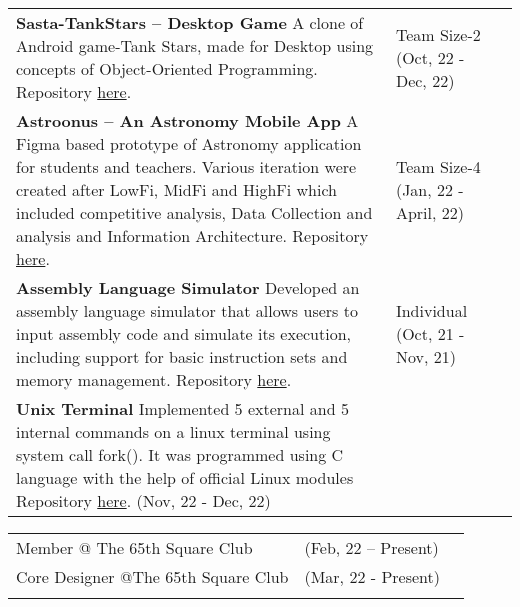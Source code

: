 \documentclass[10pt]{extarticle}
\begin{document}
\begin{contained}
\begin{longtable}{p{}p{}p{}}
    \textbf{Sasta-TankStars – Desktop Game}\newline
    A clone of Android game-Tank Stars, made for Desktop
   using concepts of Object-Oriented Programming.
    Repository \href{https://github.com/ankitkat042/Sasta-TankStars}{here}.
    &Team Size-2
    \newline (Oct, 22 - Dec, 22)\\
    \textbf{Astroonus – An Astronomy Mobile App}\newline
	 A Figma based prototype of Astronomy application for students and teachers. Various iteration were created after LowFi, MidFi and HighFi which included competitive analysis, Data Collection and analysis and Information Architecture. Repository \href{https://www.figma.com/proto/szWw1TAiKRyx429Z5nkSvS/Astroonus\_version\_1.0.1}{here}.
    &Team Size-4
    \newline (Jan, 22 - April, 22)\\
    \textbf{Assembly Language Simulator}\newline
    Developed an assembly language simulator that allows users to input assembly code and simulate its execution, including support for basic instruction sets and memory management. Repository \href{https://github.com/ankitkat042/assembler-simulator}{here}.
    &Individual
    \newline (Oct, 21 - Nov, 21)\\
    \textbf{Unix Terminal}\newline
    Implemented 5 external and 5 internal commands on a linux terminal using system call fork(). It was programmed using C language with the help of official Linux modules
    Repository \href{https://github.com/ankitkat042/Custom-Linux-Terminal}{here}.
    \newline (Nov, 22 - Dec, 22)\\
\end{longtable}
\end{contained}
\vspace{0pt}
\begin{contained}
\begin{longtable}{p{}p{}p{}}
    Member @ The 65th Square Club & (Feb, 22 – Present)\\
    Core Designer @The 65th Square Club & (Mar, 22 - Present)\\
\newline

\end{longtable}
\vspace{0pt}
\end{contained}
\end{document}
